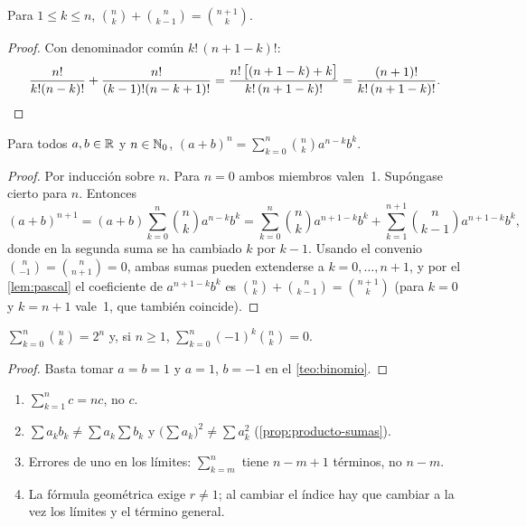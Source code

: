 \begin{lema}\label{lem:pascal}
Para $1\le k\le n$, $\displaystyle\binom nk+\binom n{k-1}=\binom{n+1}k$.
\end{lema}

\begin{proof}
Con denominador común $k!\,(n+1-k)!$:
\[
\frac{n!}{k!(n-k)!}+\frac{n!}{(k-1)!(n-k+1)!}=\frac{n!\,\bigl[(n+1-k)+k\bigr]}{k!\,(n+1-k)!}=\frac{(n+1)!}{k!\,(n+1-k)!}.\qedhere
\]
\end{proof}

\begin{teorema}\label{teo:binomio}
Para todos $a,b\in\mathbb{R}$ y $n\in\mathbb{N}_0$, $\displaystyle(a+b)^n=\sum_{k=0}^n\binom nka^{n-k}b^k$.
\end{teorema}

\begin{proof}
Por inducción sobre $n$. Para $n=0$ ambos miembros valen~1. Supóngase cierto para $n$. Entonces
\[
(a+b)^{n+1}=(a+b)\sum_{k=0}^n\binom nka^{n-k}b^k=\sum_{k=0}^n\binom nka^{n+1-k}b^k+\sum_{k=1}^{n+1}\binom n{k-1}a^{n+1-k}b^k,
\]
donde en la segunda suma se ha cambiado $k$ por $k-1$. Usando el convenio $\binom n{-1}=\binom n{n+1}=0$, ambas sumas pueden extenderse a $k=0,\dots,n+1$, y por el \cref{lem:pascal} el coeficiente de $a^{n+1-k}b^k$ es $\binom nk+\binom n{k-1}=\binom{n+1}k$ (para $k=0$ y $k=n+1$ vale~1, que también coincide).
\end{proof}

\begin{corolario}\label{cor:binomio}
$\displaystyle\sum_{k=0}^n\binom nk=2^n$ y, si $n\ge1$, $\displaystyle\sum_{k=0}^n(-1)^k\binom nk=0$.
\end{corolario}

\begin{proof}
Basta tomar $a=b=1$ y $a=1$, $b=-1$ en el \cref{teo:binomio}.
\end{proof}

\begin{observacion}
\begin{enumerate}[label=(\alph*)]
\item $\sum_{k=1}^n c=nc$, no $c$.
\item $\sum a_kb_k\neq\sum a_k\sum b_k$ y $\bigl(\sum a_k\bigr)^2\neq\sum a_k^2$ (\cref{prop:producto-sumas}).
\item Errores de uno en los límites: $\sum_{k=m}^n$ tiene $n-m+1$ términos, no $n-m$.
\item La fórmula geométrica exige $r\neq1$; al cambiar el índice hay que cambiar a la vez los límites y el término general.
\end{enumerate}
\end{observacion}

